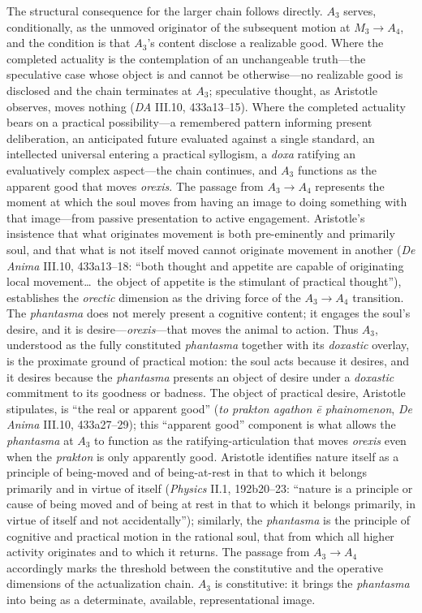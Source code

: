 \documentclass{article}
\begin{document}
The structural consequence for the larger chain follows directly. $A_3$ serves, conditionally, as the unmoved originator of the subsequent motion at $M_3 \rightarrow A_4$, and the condition is that $A_3$'s content disclose a realizable good. Where the completed actuality is the contemplation of an unchangeable truth---the speculative case whose object is and cannot be otherwise---no realizable good is disclosed and the chain terminates at $A_3$; speculative thought, as Aristotle observes, moves nothing (\textit{DA} III.10, 433a13--15). Where the completed actuality bears on a practical possibility---a remembered pattern informing present deliberation, an anticipated future evaluated against a single standard, an intellected universal entering a practical syllogism, a \textit{doxa} ratifying an evaluatively complex aspect---the chain continues, and $A_3$ functions as the apparent good that moves \textit{orexis}. The passage from $A_3 \to A_4$ represents the moment at which the soul moves from having an image to doing something with that image---from passive presentation to active engagement. Aristotle's insistence that what originates movement is both pre-eminently and primarily soul, and that what is not itself moved cannot originate movement in another (\textit{De Anima} III.10, 433a13--18: ``both thought and appetite are capable of originating local movement\ldots\ the object of appetite is the stimulant of practical thought''), establishes the \textit{orectic} dimension as the driving force of the $A_3 \to A_4$ transition. The \textit{phantasma} does not merely present a cognitive content; it engages the soul's desire, and it is desire---\textit{orexis}---that moves the animal to action. Thus $A_3$, understood as the fully constituted \textit{phantasma} together with its \textit{doxastic} overlay, is the proximate ground of practical motion: the soul acts because it desires, and it desires because the \textit{phantasma} presents an object of desire under a \textit{doxastic} commitment to its goodness or badness. The object of practical desire, Aristotle stipulates, is ``the real or apparent good'' (\textit{to prakton agathon \=e phainomenon}, \textit{De Anima} III.10, 433a27--29); this ``apparent good'' component is what allows the \textit{phantasma} at $A_3$ to function as the ratifying-articulation that moves \textit{orexis} even when the \textit{prakton} is only apparently good. Aristotle identifies nature itself as a principle of being-moved and of being-at-rest in that to which it belongs primarily and in virtue of itself (\textit{Physics} II.1, 192b20--23: ``nature is a principle or cause of being moved and of being at rest in that to which it belongs primarily, in virtue of itself and not accidentally''); similarly, the \textit{phantasma} is the principle of cognitive and practical motion in the rational soul, that from which all higher activity originates and to which it returns. The passage from $A_3 \to A_4$ accordingly marks the threshold between the constitutive and the operative dimensions of the actualization chain. $A_3$ is constitutive: it brings the \textit{phantasma} into being as a determinate, available, representational image. 
\end{document}
